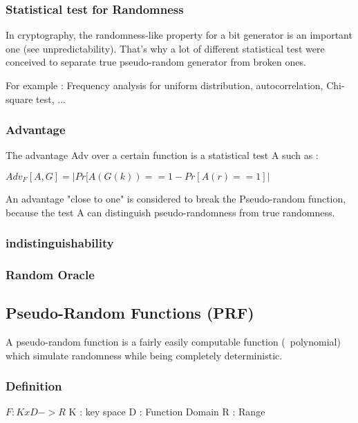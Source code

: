 \subsubsection{Statistical test for Randomness}

In cryptography, the randomness-like property for a bit generator is an important one (see unpredictability). That's why a lot of different statistical test were conceived to separate true pseudo-random generator from broken ones.

For example : Frequency analysis for uniform distribution, autocorrelation, Chi-square test, ...

\subsubsection{Advantage}
The advantage Adv over a certain function is a statistical test A such as : 

$Adv_{F} [A,G] = | Pr[A(G(k)) == 1  - Pr[A(r) == 1] | $
                     
An advantage "close to one" is considered to break the Pseudo-random function, because the test A can distinguish pseudo-randomness from true randomness.

\subsubsection{indistinguishability}


\subsubsection{Random Oracle}



\subsection{Pseudo-Random Functions     (PRF)}

A pseudo-random function is a fairly easily computable function (~polynomial) which simulate randomness while being completely deterministic.

\subsubsection{Definition}

$F : KxD ->  R$ 
K : key space
D : Function Domain
R : Range

